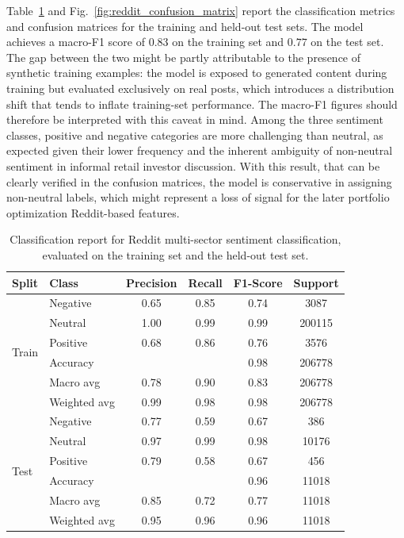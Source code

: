 Table~\ref{tab:reddit_classification_report} and Fig.~\ref{fig:reddit_confusion_matrix} report the classification metrics and confusion matrices for the training and held-out test sets. The model achieves a macro-F1 score of $0.83$ on the training set and $0.77$ on the test set. The gap between the two might be partly attributable to the presence of synthetic training examples: the model is exposed to generated content during training but evaluated exclusively on real posts, which introduces a distribution shift that tends to inflate training-set performance. The macro-F1 figures should therefore be interpreted with this caveat in mind. Among the three sentiment classes, positive and negative categories are more challenging than neutral, as expected given their lower frequency and the inherent ambiguity of non-neutral sentiment in informal retail investor discussion. With this result, that can be clearly verified in the confusion matrices, the model is conservative in assigning non-neutral labels, which might represent a loss of signal for the later portfolio optimization Reddit-based features.

\begin{table}[H]
\centering
\caption{Classification report for Reddit multi-sector sentiment classification, evaluated on the training set and the held-out test set.}
\label{tab:reddit_classification_report}
\renewcommand{\arraystretch}{1.2}
\begin{tabular}{|l|lcccc|}
\hline
\textbf{Split} & \textbf{Class} & \textbf{Precision} & \textbf{Recall} & \textbf{F1-Score} & \textbf{Support} \\
\hline\hline
\multirow{6}{*}{Train}
& Negative   & 0.65 & 0.85 & 0.74 & 3087 \\
& Neutral    & 1.00 & 0.99 & 0.99 & 200115 \\
& Positive   & 0.68 & 0.86 & 0.76 & 3576 \\
\cline{2-6}
& Accuracy   &      &      & 0.98 & 206778 \\
& Macro avg  & 0.78 & 0.90 & 0.83 & 206778 \\
& Weighted avg & 0.99 & 0.98 & 0.98 & 206778 \\
\hline\hline
\multirow{6}{*}{Test}
& Negative   & 0.77 & 0.59 & 0.67 & 386 \\
& Neutral    & 0.97 & 0.99 & 0.98 & 10176 \\
& Positive   & 0.79 & 0.58 & 0.67 & 456 \\
\cline{2-6}
& Accuracy   &      &      & 0.96 & 11018 \\
& Macro avg  & 0.85 & 0.72 & 0.77 & 11018 \\
& Weighted avg & 0.95 & 0.96 & 0.96 & 11018 \\
\hline
\end{tabular}
\end{table}

